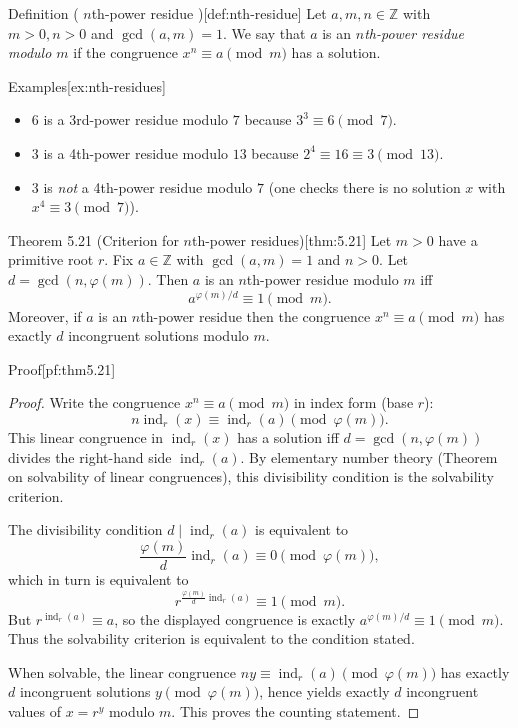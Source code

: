 \documentclass[10pt]{article}
\theoremstyle{definition}
\theoremstyle{plain}
\numberwithin{equation}{section}
\begin{document}
\bigskip

\begin{define}{Definition ( \(n\)th-power residue )}[def:nth-residue]
Let \(a,m,n\in\mathbb{Z}\) with \(m>0,n>0\) and \(\gcd(a,m)=1\). We say that \(a\) is an \emph{\(n\)th-power residue modulo \(m\)} if the congruence \(x^n\equiv a\pmod m\) has a solution.
\end{define}

\begin{define}{Examples}[ex:nth-residues]
\begin{itemize}
  \item \(6\) is a 3rd-power residue modulo \(7\) because \(3^3\equiv6\pmod7\).
  \item \(3\) is a 4th-power residue modulo \(13\) because \(2^4\equiv16\equiv3\pmod{13}\).
  \item \(3\) is \emph{not} a 4th-power residue modulo \(7\) (one checks there is no solution \(x\) with \(x^4\equiv3\pmod7\)).
\end{itemize}
\end{define}

\bigskip

\begin{define}{Theorem 5.21 (Criterion for \(n\)th-power residues)}[thm:5.21]
Let \(m>0\) have a primitive root \(r\). Fix \(a\in\mathbb{Z}\) with \(\gcd(a,m)=1\) and \(n>0\). Let \(d=\gcd(n,\varphi(m))\). Then \(a\) is an \(n\)th-power residue modulo \(m\) iff
\[
a^{\varphi(m)/d}\equiv 1\pmod m.
\]
Moreover, if \(a\) is an \(n\)th-power residue then the congruence \(x^n\equiv a\pmod m\) has exactly \(d\) incongruent solutions modulo \(m\).
\end{define}

\begin{define}{Proof}[pf:thm5.21]
\begin{proof}
Write the congruence \(x^n\equiv a\pmod m\) in index form (base \(r\)):
\[
n\operatorname{ind}_r(x)\equiv \operatorname{ind}_r(a)\pmod{\varphi(m)}.
\]
This linear congruence in \(\operatorname{ind}_r(x)\) has a solution iff \(d=\gcd(n,\varphi(m))\) divides the right-hand side \(\operatorname{ind}_r(a)\). By elementary number theory (Theorem on solvability of linear congruences), this divisibility condition is the solvability criterion.

The divisibility condition \(d\mid \operatorname{ind}_r(a)\) is equivalent to
\[
\frac{\varphi(m)}{d}\operatorname{ind}_r(a)\equiv 0\pmod{\varphi(m)},
\]
which in turn is equivalent to
\[
r^{\frac{\varphi(m)}{d}\operatorname{ind}_r(a)}\equiv 1\pmod m.
\]
But \(r^{\operatorname{ind}_r(a)}\equiv a\), so the displayed congruence is exactly \(a^{\varphi(m)/d}\equiv 1\pmod m\). Thus the solvability criterion is equivalent to the condition stated.

When solvable, the linear congruence \(n y\equiv \operatorname{ind}_r(a)\pmod{\varphi(m)}\) has exactly \(d\) incongruent solutions \(y\pmod{\varphi(m)}\), hence yields exactly \(d\) incongruent values of \(x=r^y\) modulo \(m\). This proves the counting statement.
\end{proof}
\end{define}
\end{document}
